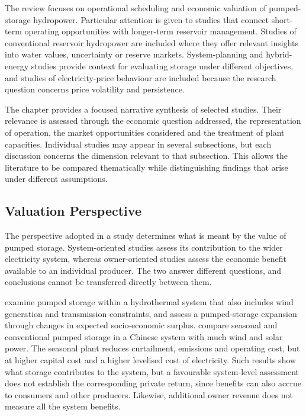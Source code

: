 The review focuses on operational scheduling and economic valuation of
pumped-storage hydropower. Particular attention is given to studies that
connect short-term operating opportunities with longer-term reservoir
management. Studies of conventional reservoir hydropower are included
where they offer relevant insights into water values, uncertainty or
reserve markets. System-planning and hybrid-energy studies provide
context for evaluating storage under different objectives, and studies
of electricity-price behaviour are included because the research question
concerns price volatility and persistence.


The chapter provides a focused narrative synthesis of selected studies.
Their relevance is assessed through the economic question addressed, the
representation of operation, the market opportunities considered and the
treatment of plant capacities. Individual studies may appear in several
subsections, but each discussion concerns the dimension relevant to that
subsection. This allows the literature to be compared thematically while
distinguishing findings that arise under different assumptions.

\subsection{Valuation Perspective}
\label{sec:lit_perspective}

The perspective adopted in a study determines what is meant by the value
of pumped storage. System-oriented studies assess its contribution to
the wider electricity system, whereas owner-oriented studies assess the
economic benefit available to an individual producer. The two answer
different questions, and conclusions cannot be transferred directly
between them.

\citet{helseth2013} examine pumped storage within a hydrothermal system
that also includes wind generation and transmission constraints, and
\citet{helseth2017} assess a pumped-storage expansion through changes in
expected socio-economic surplus. \citet{zhang2026unlocking} compare
seasonal and conventional pumped storage in a Chinese system with much
wind and solar power. The seasonal plant reduces curtailment, emissions
and operating cost, but at higher capital cost and a higher levelised
cost of electricity. Such results show what storage contributes to the
system, but a favourable system-level assessment does not establish the
corresponding private return, since benefits can also accrue to
consumers and other producers. Likewise, additional owner revenue does
not measure all the system benefits.

